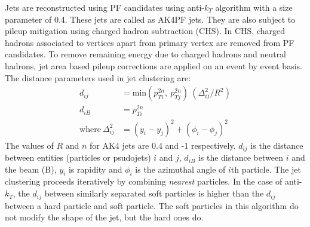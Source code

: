 Jets are reconstructed using PF candidates using anti-$k_T$ algorithm \cite{Cacciari:2008gp,Cacciari:2011ma} with a size parameter of 0.4. 
These jets are called as AK4PF jets. They are also subject to pileup mitigation using charged hadron subtraction (CHS). In CHS, charged 
hadrons associated to vertices apart from primary vertex are removed from PF candidates. To remove remaining energy due to charged hadrons 
and neutral hadrons, jet area based pileup corrections are applied on an event by event basis. The distance parameters used in jet 
clustering are:
\begin{align}
d_{ij} &= \mathrm{min}(p_{Ti}^{2n},\  p_{Tj}^{2n})\ (\Delta_{ij}^2/R^2)\\
d_{iB} &= p_{Ti}^{2n}\ \\ 
\mathrm{where\ } \Delta_{ij}^2 &= (y_i-y_j)^2 + (\phi_i - \phi_j)^2
\end{align}
The values of $R$ and $n$ for AK4 jets are 0.4 and -1 respectively. $d_{ij}$ is the distance between entities (particles or psudojets) $i$ 
and $j$, $d_{iB}$ is the distance between $i$ and the beam (B), $y_i$ is rapidity and $\phi_i$ is the azimuthal angle of $i$th particle. 
The jet clustering proceeds iteratively by combining \textit{nearest} particles. In the case of anti-$k_T$, the $d_{ij}$ between similarly 
separated soft particles is higher than the $d_{ij}$ between a hard particle and soft particle. The soft particles in this algorithm do 
not modify the shape of the jet, but the hard ones do.

